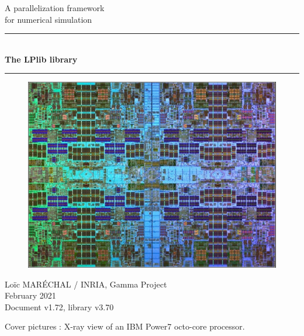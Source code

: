 \documentclass[a4paper,12pt]{article}
\newcommand{\HRule}{\rule{\linewidth}{1mm}}
\begin{document}
%
%

\begin{titlepage}

\begin{center}
\huge A parallelization framework\\ for numerical simulation
\HRule \\
\medskip
{\Huge \bfseries The LPlib library} \\
\HRule
\end{center}


\begin{figure}[htbp]
\begin{center}
\includegraphics[width=12cm]{power7.pdf}
\end{center}
\end{figure}


\begin{flushright}
\Large Lo\"ic MAR\'ECHAL / INRIA, Gamma Project\\
\Large February 2021 \\
\normalsize Document v1.72, library v3.70
\end{flushright}

\end{titlepage}

\clearpage

\setcounter{tocdepth}{2}
\tableofcontents
\vfill

\footnotesize{Cover pictures : X-ray view of an IBM Power7 octo-core processor.}
\normalsize
\end{document}
